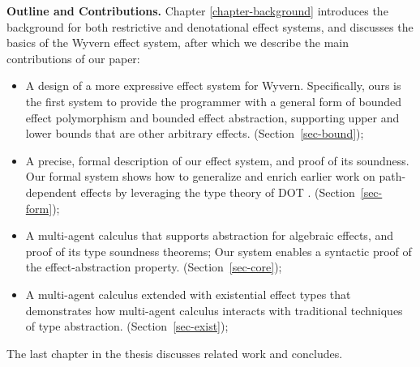 \noindent\textbf{Outline and Contributions.}  
Chapter \ref{chapter-background} introduces the background for both restrictive and denotational effect systems, and discusses the basics of the Wyvern effect system, after which we describe the main contributions of our paper:
\begin{itemize}
\item A design of a more expressive effect system for Wyvern. Specifically, ours is the first system to provide the programmer with a general form of bounded effect polymorphism and bounded effect abstraction, supporting upper and lower bounds that are other arbitrary effects.  (Section~\ref{sec-bound});
\item A precise, formal description of our effect system, and proof of its soundness.  Our formal system shows how to generalize and enrich earlier work on path-dependent effects by leveraging the type theory of DOT \cite{amin14}. (Section~\ref{sec-form});
\item A multi-agent calculus  that supports abstraction for algebraic effects, and proof of its type soundness theorems;  Our system enables a syntactic proof of the effect-abstraction property. (Section~\ref{sec-core});
\item A multi-agent calculus extended with existential effect types that demonstrates how multi-agent calculus interacts with traditional techniques of type abstraction. (Section~\ref{sec-exist});
\end{itemize}
The last chapter in the thesis discusses related work and concludes.
